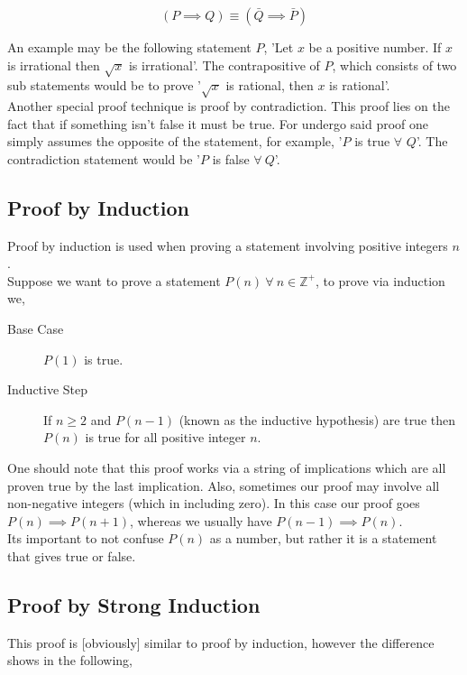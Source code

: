 \documentclass{article}
\begin{document}
         \[(P \implies Q) \equiv (\bar{Q} \implies \bar{P})\]

         An example may be the following statement $P$, 'Let $x$ be a positive number. If $x$ is irrational then $\sqrt{x}$ is irrational'. The contrapositive of $P$, which consists of two sub statements would be to prove '$\sqrt{x}$ is rational, then $x$ is rational'.\\
         
         Another special proof technique is proof by contradiction. This proof lies on the fact that if something isn't false it must be true. For undergo said proof one simply assumes the opposite of the statement, for example, '$P$ is true $\forall$ $Q$'. The contradiction statement would be '$P$ is false $\forall~ Q$'.\\

         \subsection{Proof by Induction}
            Proof by induction is used when proving a statement involving positive integers $n$.\\ 
            
            Suppose we want to prove a statement $P(n)~\forall~n\in\mathbb{Z}^+$, to prove via induction we,

            \begin{description}
                \item [Base Case] $P(1)$ is true.
                \item [Inductive Step] If $n\geq 2$ and $P(n-1)$ (known as the inductive hypothesis) are true then $P(n)$ is true for all positive integer $n$.
            \end{description}

            One should note that this proof works via a string of implications which are all proven true by the last implication. Also, sometimes our proof may involve all non-negative integers (which in including zero). In this case our proof goes $P(n)\implies P(n+1)$, whereas we usually have $P(n-1) \implies P(n)$.\\

            Its important to not confuse $P(n)$ as a number, but rather it is a statement that gives true or false.
            
        \subsection{Proof by Strong Induction}
            This proof is [obviously] similar to proof by induction, however the difference shows in the following,
\end{document}
